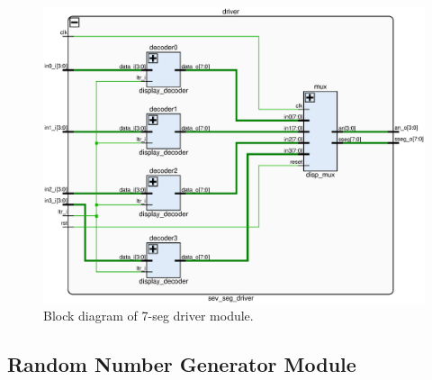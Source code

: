\documentclass[11pt]{article}
\begin{document}
\begin{figure}[H]
	\includegraphics [width=5in]{display_driver.eps}
	\centering
	\caption{Block diagram of 7-seg driver module.}
	\label{fig:7SegDriver}
\end{figure}


\subsection{Random Number Generator Module}
\end{document}
